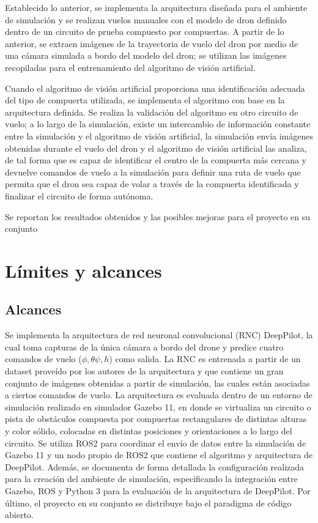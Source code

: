 Establecido lo anterior, se implementa la arquitectura diseñada para el ambiente de simulación y se realizan vuelos manuales con el modelo de dron definido dentro de un circuito de prueba compuesto por compuertas. A partir de lo anterior, se extraen imágenes de la trayectoria de vuelo del dron por medio de una cámara simulada a bordo del modelo del dron; se utilizan las imágenes recopiladas para el entrenamiento del algoritmo de visión artificial.

Cuando el algoritmo de visión artificial proporciona una identificación adecuada del tipo de compuerta utilizada, se implementa el algoritmo con base en la arquitectura definida. Se realiza la validación del algoritmo en otro circuito de vuelo; a lo largo de la simulación, existe un intercambio de información constante entre la simulación y el algoritmo de visión artificial, la simulación envía imágenes obtenidas durante el vuelo del dron y el algoritmo de visión artificial las analiza, de tal forma que es capaz de identificar el centro de la compuerta más cercana y devuelve comandos de vuelo a la simulación para definir una ruta de vuelo que permita que el dron sea capaz de volar a través de la compuerta identificada y finalizar el circuito de forma autónoma.

Se reportan los resultados obtenidos y las posibles mejoras para el proyecto en su conjunto



\section{Límites y alcances}

\subsection{Alcances}
Se implementa la arquitectura de red neuronal convolucional (RNC) DeepPilot, la cual toma capturas de la única cámara a bordo del drone y predice cuatro comandos de vuelo ($\phi,\theta\psi,h$) como salida. La RNC es entrenada a partir de un dataset proveído por los autores de la arquitectura y que contiene un gran conjunto de imágenes obtenidas a partir de simulación, las cuales están asociadas a ciertos comandos de vuelo.    La arquitectura es evaluada dentro de un entorno de simulación realizado en simulador Gazebo 11, en donde se virtualiza un circuito o pista de obstáculos compuesta por compuertas rectangulares de distintas alturas y color sólido, colocadas en distintas posiciones y orientaciones a lo largo del circuito. Se utiliza ROS2 para coordinar el envío de datos entre la simulación de Gazebo 11 y un nodo propio de ROS2 que contiene el algoritmo y arquitectura de DeepPilot. Además, se documenta de forma detallada la configuración realizada para la creación del ambiente de simulación, especificando la integración entre Gazebo, ROS y Python 3 para la evaluación de la arquitectura de DeepPilot. Por último, el proyecto en su conjunto se distribuye bajo el paradigma de código abierto.

